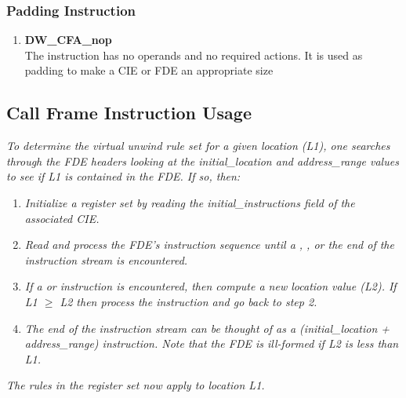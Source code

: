 \subsubsection{Padding Instruction}
\label{chap:paddinginstruction}
\begin{enumerate}[1. ]
\item \textbf{DW\_CFA\_nop} \\
The  instruction has no operands and no required
actions. It is used as padding to make a CIE or FDE an
appropriate size

\end{enumerate}

\subsection{Call Frame Instruction Usage} 
\label{chap:callframeinstructionusage}

\textit{To determine the virtual unwind rule set for a given location
(L1), one searches through the FDE headers looking at the
initial\_location and address\_range values to see if L1 is
contained in the FDE. If so, then:}
\begin{enumerate}[1. ]

\item \textit{Initialize a register set by reading the
initial\_instructions field of the associated CIE.}

\item \textit{Read and process the FDE\textquoteright s instruction
sequence until a , 
, or the
end of the instruction stream is encountered.}

\item \textit{ If a  or 
instruction is encountered, then compute a new location value
(L2). If L1 $\geq$ L2 then process the instruction and go back
to step 2.}

\item \textit{ The end of the instruction stream can be thought
of as a  (initial\_location + address\_range)
instruction. Note that the FDE is ill-formed if L2 is less
than L1.}

\end{enumerate}

\textit{The rules in the register set now apply to location L1.}

